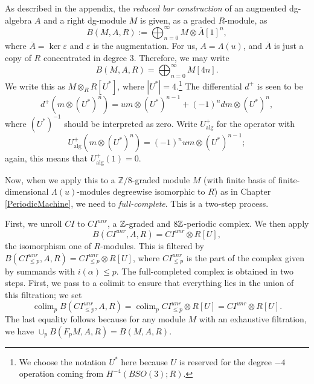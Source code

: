 \documentclass{memo-l}
\DeclareMathOperator{\colim}{colim}
\theoremstyle{definition}
\theoremstyle{remark}
\numberwithin{section}{chapter}
\numberwithin{equation}{chapter}
\begin{document}
As described in the appendix, the \emph{reduced bar construction} of an augmented dg-algebra $A$ and a right dg-module $M$ is given, as a graded $R$-module, as $$B(M,A,R) := \bigoplus_{n=0}^\infty M \otimes \overline A[1]^n,$$ where $\overline A = \ker \varepsilon$ and $\varepsilon$ is the augmentation. For us, $A = \Lambda(u)$, and $\overline A$ is just a copy of $R$ concentrated in degree $3$. Therefore, we may write $$B(M, A, R) = \bigoplus_{n=0}^\infty  M[4n].$$ We write this as $M \otimes_R R[U^*]$, where $|U^*| = 4$.\footnote{We choose the notation $U^*$ here because $U$ is reserved for the degree $-4$ operation coming from $H^{-4}(BSO(3);R)$.} The differential $d^+$ is seen to be 
$$d^+(m \otimes (U^*)^n) = um \otimes (U^*)^{n-1} + (-1)^n dm \otimes (U^*)^n,$$ 
where $(U^*)^{-1}$ should be interpreted as zero. Write $U_{\text{alg}}^+$ for the operator with $$U_{\text{alg}}^+\left(m \otimes (U^*)^n\right) = (-1)^n um \otimes (U^*)^{n-1};$$ again, this means that $U_{\text{alg}}^+(1) = 0$.

Now, when we apply this to a $\mathbb Z/8$-graded module $M$ (with finite basis of finite-dimensional $\Lambda(u)$-modules degreewise isomorphic to $R$) as in Chapter \ref{PeriodicMachine}, we need to \emph{full-complete}. This is a two-step process. 

First, we unroll $CI$ to $CI^{unr}$, a $\Bbb Z$-graded and $8\Bbb Z$-periodic complex. We then apply $$B(CI^{unr}, A, R) = CI^{unr} \otimes R[U],$$ the isomorphism one of $R$-modules. This is filtered by $B(CI^{unr}_{\le p}, A, R) = CI^{unr}_{\le p} \otimes R[U]$, where $CI^{unr}_{\le p}$ is the part of the complex given by summands with $i(\alpha) \le p$. The full-completed complex is obtained in two steps. First, we pass to a colimit to ensure that everything lies in the union of this filtration; we set $$\colim_p B(CI^{unr}_{\le p}, A, R) = \colim_p CI^{unr}_{\le p} \otimes R[U] = CI^{unr} \otimes R[U].$$ The last equality follows because for any module $M$ with an exhaustive filtration, we have $\cup_p B(F_p M, A, R) = B(M, A, R)$. 
\end{document}
